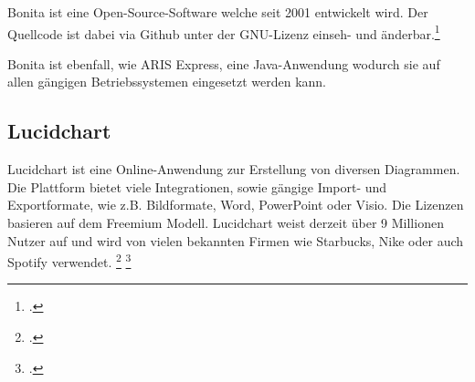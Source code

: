 Bonita ist eine Open-Source-Software welche seit 2001 entwickelt wird. Der
Quellcode ist dabei via Github unter der GNU-Lizenz einseh- und
änderbar.\footcite{bonitasource}

\begin{figure}[H]
\begin{minipage}{\linewidth}
\begin{center}
\end{center}
\end{minipage}
\end{figure}

Bonita ist ebenfall, wie ARIS Express, eine Java-Anwendung wodurch sie auf allen
gängigen Betriebssystemen eingesetzt werden kann.

\subsection{Lucidchart}
Lucidchart ist eine Online-Anwendung zur Erstellung von diversen Diagrammen. Die
Plattform bietet viele Integrationen, sowie gängige Import- und Exportformate,
wie z.B. Bildformate, Word, PowerPoint oder Visio. Die Lizenzen basieren
auf dem Freemium Modell. Lucidchart weist derzeit über 9 Millionen Nutzer auf
und wird von vielen bekannten Firmen wie Starbucks, Nike oder auch Spotify
verwendet. \footcite{lucidchart} \footcite{lucidchartpricing}

